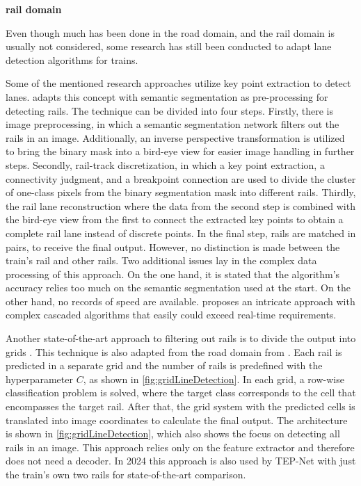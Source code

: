 \textbf{rail domain}

Even though much has been done in the road domain, and the rail domain is usually not considered, some research has still been conducted to adapt lane detection algorithms for trains.


Some of the mentioned research approaches utilize key point extraction to detect lanes.
\cite{topologyGuidedRailDetection2022} adapts this concept with semantic segmentation as pre-processing for detecting rails.
The technique can be divided into four steps.
Firstly, there is image preprocessing, in which a semantic segmentation network filters out the rails in an image.
Additionally, an inverse perspective transformation is utilized to bring the binary mask into a bird-eye view for easier image handling in further steps.
Secondly, rail-track discretization, in which a key point extraction, a connectivity judgment, and a breakpoint connection are used to divide the cluster of one-class pixels from the binary segmentation mask into different rails.
Thirdly, the rail lane reconstruction where the data from the second step is combined with the bird-eye view from the first to connect the extracted key points to obtain a complete rail lane instead of discrete points.
In the final step, rails are matched in pairs, to receive the final output.
However, no distinction is made between the train's rail and other rails.
Two additional issues lay in the complex data processing of this approach.
On the one hand, it is stated that the algorithm's accuracy relies too much on the semantic segmentation used at the start.
On the other hand, no records of speed are available.
\cite{topologyGuidedRailDetection2022} proposes an intricate approach with complex cascaded algorithms that easily could exceed real-time requirements.


Another state-of-the-art approach to filtering out rails is to divide the output into grids \cite{li2022rail}.
This technique is also adapted from the road domain from \cite{laneDetectionGrid2020}.
Each rail is predicted in a separate grid and the number of rails is predefined with the hyperparameter $C$, as shown in \autoref{fig:gridLineDetection}.
In each grid, a row-wise classification problem is solved, where the target class corresponds to the cell that encompasses the target rail.
After that, the grid system with the predicted cells is translated into image coordinates to calculate the final output.
The architecture is shown in \autoref{fig:gridLineDetection}, which also shows the focus on detecting all rails in an image.
This approach relies only on the feature extractor and therefore does not need a decoder.
In 2024 this approach is also used by TEP-Net \cite{tepNet2024} with just the train's own two rails for state-of-the-art comparison.

